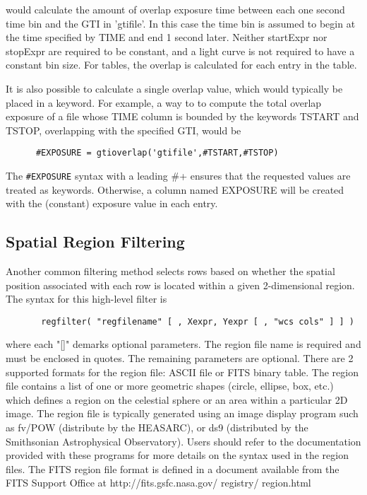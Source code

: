 \documentclass[11pt]{book}
\begin{document}
    would calculate the amount of overlap exposure time between each
    one second time bin and the GTI in 'gtifile'.  In this case the
    time bin is assumed to begin at the time specified by TIME and end
    1 second later.  Neither startExpr nor stopExpr are required to be
    constant, and a light curve is not required to have a constant bin
    size.  For tables, the overlap is calculated for each entry in the
    table.

    It is also possible to calculate a single overlap value, which
    would typically be placed in a keyword.  For example, a way to to
    compute the total overlap exposure of a file whose TIME column is
    bounded by the keywords TSTART and TSTOP, overlapping with the
    specified GTI, would be

\begin{verbatim}
      #EXPOSURE = gtioverlap('gtifile',#TSTART,#TSTOP)
\end{verbatim}

    The \verb+#EXPOSURE+ syntax with a leading \+#+ ensures that the 
    requested values are treated as keywords.  Otherwise, a column
    named EXPOSURE will be created with the (constant) exposure value
    in each entry.  



\subsection{Spatial Region Filtering}

    Another common  filtering method selects rows based on whether the
    spatial position associated with each row is located within a given
    2-dimensional region.  The syntax for this high-level filter is

\begin{verbatim}
       regfilter( "regfilename" [ , Xexpr, Yexpr [ , "wcs cols" ] ] )
\end{verbatim}
    where each "[]" demarks optional parameters. The region file name
    is required and must be  enclosed in quotes.  The remaining
    parameters are optional.  There are 2 supported formats for the
    region file: ASCII file or FITS binary table.  The region file
    contains a list of one or more geometric shapes (circle,
    ellipse, box, etc.) which defines a region on the celestial sphere
    or an area within a particular 2D image.  The region file is
    typically generated using an image display program such as fv/POW
    (distribute by the HEASARC), or ds9 (distributed by the Smithsonian
    Astrophysical Observatory).  Users should refer to the documentation
    provided with these programs for more details on the syntax used in
    the region files.  The FITS region file format is defined in a document
    available from the FITS Support Office at
    http://fits.gsfc.nasa.gov/ registry/ region.html
\end{document}
